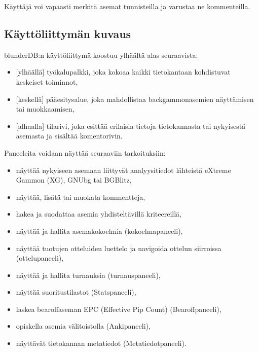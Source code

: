 \documentclass[letterpaper,10pt,finnish]{sphinxmanual}
\begin{document}
\sphinxAtStartPar
Käyttäjä voi vapaasti merkitä asemat tunnisteilla ja varustaa ne kommenteilla.


\subsection{Käyttöliittymän kuvaus}
\label{\detokenize{manuel:description-de-l-interface}}
\sphinxAtStartPar
blunderDB:n käyttöliittymä koostuu ylhäältä alas seuraavista:
\begin{itemize}
\item {} 
\sphinxAtStartPar
{[}ylhäällä{]} työkalupalkki, joka kokoaa kaikki tietokantaan kohdistuvat keskeiset toiminnot,

\item {} 
\sphinxAtStartPar
{[}keskellä{]} pääesitysalue, joka mahdollistaa backgammon\sphinxhyphen{}asemien näyttämisen tai muokkaamisen,

\item {} 
\sphinxAtStartPar
{[}alhaalla{]} tilarivi, joka esittää erilaisia tietoja tietokannasta tai nykyisestä asemasta ja sisältää komentorivin.

\end{itemize}

\sphinxAtStartPar
Paneeleita voidaan näyttää seuraaviin tarkoituksiin:
\begin{itemize}
\item {} 
\sphinxAtStartPar
näyttää nykyiseen asemaan liittyvät analyysitiedot lähteistä eXtreme Gammon (XG), GNUbg tai BGBlitz,

\item {} 
\sphinxAtStartPar
näyttää, lisätä tai muokata kommentteja,

\item {} 
\sphinxAtStartPar
hakea ja suodattaa asemia yhdisteltävillä kriteereillä,

\item {} 
\sphinxAtStartPar
näyttää ja hallita asemakokoelmia (kokoelmapaneeli),

\item {} 
\sphinxAtStartPar
näyttää tuotujen otteluiden luettelo ja navigoida ottelun siirroissa (ottelupaneeli),

\item {} 
\sphinxAtStartPar
näyttää ja hallita turnauksia (turnauspaneeli),

\item {} 
\sphinxAtStartPar
näyttää suoritustilastot (Stats\sphinxhyphen{}paneeli),

\item {} 
\sphinxAtStartPar
laskea bearoff\sphinxhyphen{}aseman EPC (Effective Pip Count) (Bearoff\sphinxhyphen{}paneeli),

\item {} 
\sphinxAtStartPar
opiskella asemia välitoistolla (Anki\sphinxhyphen{}paneeli),

\item {} 
\sphinxAtStartPar
näyttävät tietokannan metatiedot (Metatiedot\sphinxhyphen{}paneeli).

\end{itemize}
\end{document}
